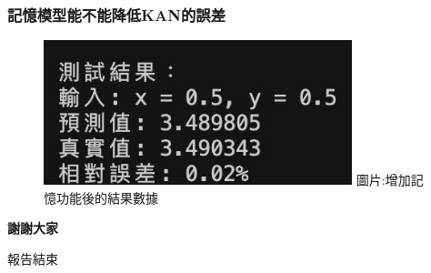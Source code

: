 \documentclass{beamer}
\begin{document}
\begin{frame}
    \frametitle{記憶模型能不能降低KAN的誤差}
    \begin{figure}
        \centering
        \begin{minipage}{\textwidth}
            \includegraphics[width=0.8\textwidth,height=0.4\textheight,keepaspectratio]{figures/增加記憶功能後的結果.jpg}
            \centering
            圖片:增加記憶功能後的結果數據
        \end{minipage}
    \end{figure}
\end{frame}

\begin{frame}
    \begin{center}
        \Huge\textbf{謝謝大家}
        
        \vspace{1em}
        \Large 報告結束
    \end{center}
\end{frame}
\end{document}
